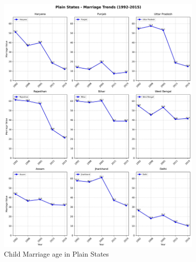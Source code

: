 \begin{figure}[H]
    \centering
    \includegraphics[width=0.9\textwidth]{figures/nfhs/plain_states_marriage_subplots.pdf}
    \caption{Child Marriage age in Plain States}
    \label{fig:nfhs_plain_marriage}
\end{figure}

